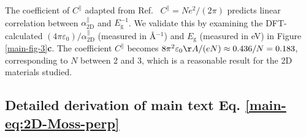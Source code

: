 \documentclass[journal=ancac3,email=true,hyperref=true,keywords=false]{achemso}
\begin{document}
The coefficient of $C^{\parallel}$ adapted from
Ref.~ $C^{\parallel} = N e^{2}/(2\pi)$
predicts linear correlation between $\alpha^{\parallel}_{\mathrm{2D}}$
and $E_{\mathrm{g}}^{-1}$. We validate this by examining the
DFT-calculated
$(4\pi \varepsilon_{0})/\alpha^{\parallel}_{\mathrm{2D}}$ (measured in
\AA{}$^{-1}$) and $E_{\mathrm{g}}$ (measured in eV) in
Figure \ref{main-fig-3}\textbf{c}. The coefficient $C^{\parallel}$
becomes
$8 \pi^{2} \varepsilon_{0} \AA{} / (e N) \approx 0.436 / N = 0.183$,
corresponding to $N$ between 2 and 3, which is a reasonable result for
the 2D materials studied.



\subsection{Detailed derivation of main text Eq. \ref{main-eq:2D-Moss-perp}}
\label{ssec:theory-1-perp}
\end{document}
